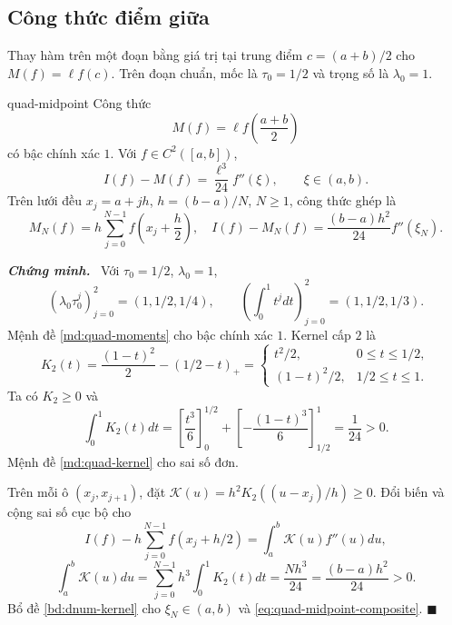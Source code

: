 \documentclass[12pt,a4paper,oneside]{book}
\numberwithin{algorithm}{chapter}
\theoremstyle{definition}
\newenvironment{chungminh}{\par\medskip\noindent\textbf{\textit{\color{mainblue}Chứng minh.}}\ }{\hfill$\blacksquare$\par\medskip}
\begin{document}
\subsection{Công thức điểm giữa}
Thay hàm trên một đoạn bằng giá trị tại trung điểm $c=(a+b)/2$ cho $M(f)=\ell f(c)$. Trên đoạn chuẩn, mốc là $\tau_0=1/2$ và trọng số là $\lambda_0=1$.
\begin{dinhly}{}{quad-midpoint}
Công thức
\[
 M(f)=\ell f\left(\frac{a+b}{2}\right)
\]
có bậc chính xác $1$. Với $f\in C^2([a,b])$,
\[
 I(f)-M(f)=\frac{\ell^3}{24}f''(\xi),\qquad \xi\in(a,b).
\]
Trên lưới đều $x_j=a+jh$, $h=(b-a)/N$, $N\geq1$, công thức ghép là
\begin{equation}\label{eq:quad-midpoint-composite}
 M_N(f)=h\sum_{j=0}^{N-1}f\left(x_j+\frac h2\right),
 \quad I(f)-M_N(f)=\frac{(b-a)h^2}{24}f''(\xi_N).
\end{equation}
\end{dinhly}
\begin{chungminh}
Với $\tau_0=1/2$, $\lambda_0=1$,
\[
 (\lambda_0\tau_0^j)_{j=0}^2=(1,1/2,1/4),\qquad
 \left(\int_0^1t^jdt\right)_{j=0}^2=(1,1/2,1/3).
\]
Mệnh đề \ref{md:quad-moments} cho bậc chính xác $1$. Kernel cấp $2$ là
\[
 K_2(t)=\frac{(1-t)^2}{2}-(1/2-t)_+
 =\begin{cases}t^2/2,&0\leq t\leq1/2,\\(1-t)^2/2,&1/2\leq t\leq1.\end{cases}
\]
Ta có $K_2\geq0$ và
\[
 \int_0^1K_2(t)dt
 =\left[\frac{t^3}{6}\right]_0^{1/2}
 +\left[-\frac{(1-t)^3}{6}\right]_{1/2}^{1}=\frac1{24}>0.
\]
Mệnh đề \ref{md:quad-kernel} cho sai số đơn.

Trên mỗi ô $(x_j,x_{j+1})$, đặt $\mathcal K(u)=h^2K_2((u-x_j)/h)\geq0$. Đổi biến và cộng sai số cục bộ cho
\[
 I(f)-h\sum_{j=0}^{N-1}f(x_j+h/2)=\int_a^b\mathcal K(u)f''(u)du,
\]
\[
 \int_a^b\mathcal K(u)du
 =\sum_{j=0}^{N-1}h^3\int_0^1K_2(t)dt
 =\frac{Nh^3}{24}=\frac{(b-a)h^2}{24}>0.
\]
Bổ đề \ref{bd:dnum-kernel} cho $\xi_N\in(a,b)$ và \eqref{eq:quad-midpoint-composite}.
\end{chungminh}

\end{document}
